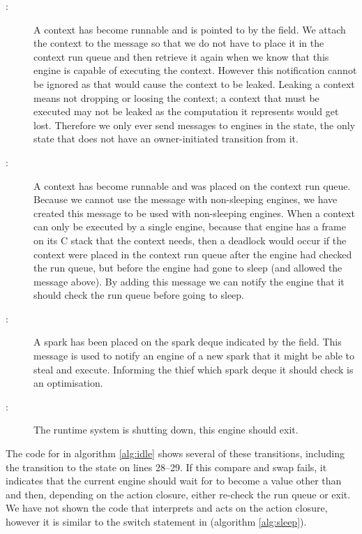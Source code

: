 \begin{description}

    \item[:]
    A context has become runnable and is pointed to by the
     field.
    We attach the context to the message so that we do not have to place it
    in the context run queue and then retrieve it again when we know that
    this engine is capable of executing the context.
    However this notification cannot be ignored as that would cause the
    context to be leaked.
    Leaking a context means not dropping or loosing the context;
    a context that must be executed may not be leaked as the computation it
    represents would get lost.
    Therefore we only ever send  messages to engines in
    the  state,
    the only state that does not have an owner-initiated transition from 
    it.

    \item[:]
    A context has become runnable and was placed on the context run queue.
    Because we cannot use the  message with
    non-sleeping engines,
    we have created this message to be used with non-sleeping engines.
    When a context can only be executed by a single engine,
    because that engine has a frame on its C stack that the context needs,
    then a deadlock would occur if the context were placed in the context run
    queue after the engine had checked the run queue,
    but before the engine had gone to sleep (and allowed the message above).
    By adding this message we can notify the engine that it should check the
    run queue before going to sleep.

    \item[:]
    A spark has been placed on the spark deque indicated by the
     field.
    This message is used to notify an engine of a new spark that it might be
    able to steal and execute.
    Informing the thief which spark deque it should check is an
    optimisation.

    \item[:]
    The runtime system is shutting down, this engine should exit.

\end{description}

\noindent
{}
The code for \idle in algorithm \ref{alg:idle} shows several of these
transitions,
including the transition to the  state on lines 28--29.
If this compare and swap fails,
it indicates that the current engine should 
wait for  to become a value other than  and then,
depending on the action closure,
either re-check the run queue or exit.
We have not shown the code that interprets and acts on the action closure,
however it is similar to the switch statement in \sleep (algorithm
\ref{alg:sleep}).

